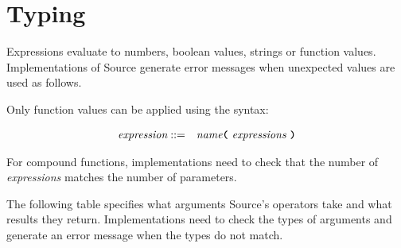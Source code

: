 
\section{Typing}

Expressions evaluate to numbers, boolean values, strings or function values. Implementations
of Source generate error messages when unexpected values are used as follows.

Only function values can be applied using the syntax:

\begin{eqnarray*}
 \textit{expression}    
                                   & ::=   &  \textit{name}
                                               \texttt{\textbf{(}}\  \textit{expressions} \
                                               \texttt{\textbf{)}}\\ 
\end{eqnarray*}

For compound functions, implementations need to check that the number of \textit{expressions}
matches the number of parameters.

The following table specifies what arguments Source's operators
take and what results they return. Implementations need to check the types of arguments and
generate an error message when the types do not match.

